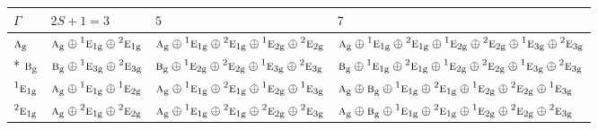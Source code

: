 \documentclass[10pt,a4paper]{article}
\numberwithin{equation}{section}
\newcommand{\irr}[1]{\text{\normalfont\scshape #1}}
\newcommand{\conjpair}[1]{{}^{#1}}
\newcommand{\ptag}[1]{\mathrm{#1}}
\begin{document}
{\small\setlength{\tabcolsep}{3pt}\begin{longtable}{@{}l>{\RaggedRight\arraybackslash}p{}>{\RaggedRight\arraybackslash}p{}>{\RaggedRight\arraybackslash}p{}@{}}\toprule
$\Gamma$ & $2S + 1 = 3$ & $5$ & $7$\\\midrule\endhead
\bottomrule\endfoot\endlastfoot
$\irr{a}_{\ptag{g}}$ & $\irr{a}_{\ptag{g}}\oplus \conjpair{1}\irr{e}_{1\ptag{g}}\oplus \conjpair{2}\irr{e}_{1\ptag{g}}$ & $\irr{a}_{\ptag{g}}\oplus \conjpair{1}\irr{e}_{1\ptag{g}}\oplus \conjpair{2}\irr{e}_{1\ptag{g}}\oplus \conjpair{1}\irr{e}_{2\ptag{g}}\oplus \conjpair{2}\irr{e}_{2\ptag{g}}$ & $\irr{a}_{\ptag{g}}\oplus \conjpair{1}\irr{e}_{1\ptag{g}}\oplus \conjpair{2}\irr{e}_{1\ptag{g}}\oplus \conjpair{1}\irr{e}_{2\ptag{g}}\oplus \conjpair{2}\irr{e}_{2\ptag{g}}\oplus \conjpair{1}\irr{e}_{3\ptag{g}}\oplus \conjpair{2}\irr{e}_{3\ptag{g}}$\\*
$\irr{b}_{\ptag{g}}$ & $\irr{b}_{\ptag{g}}\oplus \conjpair{1}\irr{e}_{3\ptag{g}}\oplus \conjpair{2}\irr{e}_{3\ptag{g}}$ & $\irr{b}_{\ptag{g}}\oplus \conjpair{1}\irr{e}_{2\ptag{g}}\oplus \conjpair{2}\irr{e}_{2\ptag{g}}\oplus \conjpair{1}\irr{e}_{3\ptag{g}}\oplus \conjpair{2}\irr{e}_{3\ptag{g}}$ & $\irr{b}_{\ptag{g}}\oplus \conjpair{1}\irr{e}_{1\ptag{g}}\oplus \conjpair{2}\irr{e}_{1\ptag{g}}\oplus \conjpair{1}\irr{e}_{2\ptag{g}}\oplus \conjpair{2}\irr{e}_{2\ptag{g}}\oplus \conjpair{1}\irr{e}_{3\ptag{g}}\oplus \conjpair{2}\irr{e}_{3\ptag{g}}$\\
$\conjpair{1}\irr{e}_{1\ptag{g}}$ & $\irr{a}_{\ptag{g}}\oplus \conjpair{1}\irr{e}_{1\ptag{g}}\oplus \conjpair{1}\irr{e}_{2\ptag{g}}$ & $\irr{a}_{\ptag{g}}\oplus \conjpair{1}\irr{e}_{1\ptag{g}}\oplus \conjpair{2}\irr{e}_{1\ptag{g}}\oplus \conjpair{1}\irr{e}_{2\ptag{g}}\oplus \conjpair{1}\irr{e}_{3\ptag{g}}$ & $\irr{a}_{\ptag{g}}\oplus \irr{b}_{\ptag{g}}\oplus \conjpair{1}\irr{e}_{1\ptag{g}}\oplus \conjpair{2}\irr{e}_{1\ptag{g}}\oplus \conjpair{1}\irr{e}_{2\ptag{g}}\oplus \conjpair{2}\irr{e}_{2\ptag{g}}\oplus \conjpair{1}\irr{e}_{3\ptag{g}}$\\
$\conjpair{2}\irr{e}_{1\ptag{g}}$ & $\irr{a}_{\ptag{g}}\oplus \conjpair{2}\irr{e}_{1\ptag{g}}\oplus \conjpair{2}\irr{e}_{2\ptag{g}}$ & $\irr{a}_{\ptag{g}}\oplus \conjpair{1}\irr{e}_{1\ptag{g}}\oplus \conjpair{2}\irr{e}_{1\ptag{g}}\oplus \conjpair{2}\irr{e}_{2\ptag{g}}\oplus \conjpair{2}\irr{e}_{3\ptag{g}}$ & $\irr{a}_{\ptag{g}}\oplus \irr{b}_{\ptag{g}}\oplus \conjpair{1}\irr{e}_{1\ptag{g}}\oplus \conjpair{2}\irr{e}_{1\ptag{g}}\oplus \conjpair{1}\irr{e}_{2\ptag{g}}\oplus \conjpair{2}\irr{e}_{2\ptag{g}}\oplus \conjpair{2}\irr{e}_{3\ptag{g}}$\\

\end{longtable}}
\end{document}
